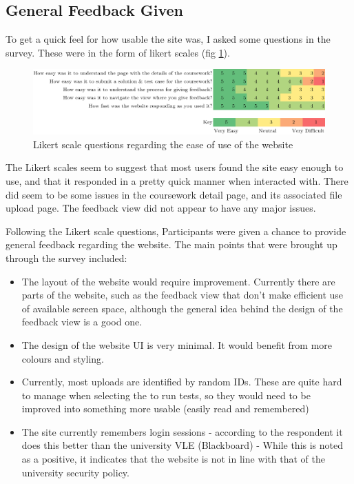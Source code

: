 \documentclass[a4paper,11pt]{report}
\begin{document}
\subsection{General Feedback Given}
To get a quick feel for how usable the site was, I asked some questions in the survey. These were in the form of likert scales (fig \ref{fig:likert-use}).\par
\begin{figure}[ht]
\includegraphics[width=\textwidth]{eva-result/likert-site-usable.png}
\caption{Likert scale questions regarding the ease of use of the website}
\label{fig:likert-use}
\end{figure}
The Likert scales seem to suggest that most users found the site easy enough to use, and that it responded in a pretty quick manner when interacted with. There did seem to be some issues in the coursework detail page, and its associated file upload page. The feedback view did not appear to have any major issues.\par
Following the Likert scale questions, Participants were given a chance to provide general feedback regarding the website. The main points that were brought up through the survey included:
\begin{itemize}
\item The layout of the website would require improvement. Currently there are parts of the website, such as the feedback view that don't make efficient use of available screen space, although the general idea behind the design of the feedback view is a good one.
\item The design of the website UI is very minimal. It would benefit from more colours and styling.
\item Currently, most uploads are identified by random IDs. These are quite hard to manage when selecting the to run tests, so they would need to be improved into something more usable (easily read and remembered)
\item The site currently remembers login sessions - according to the respondent it does this better than the university VLE (Blackboard) - While this is noted as a positive, it indicates that the website is not in line with that of the university security policy.
\end{itemize}
\end{document}

